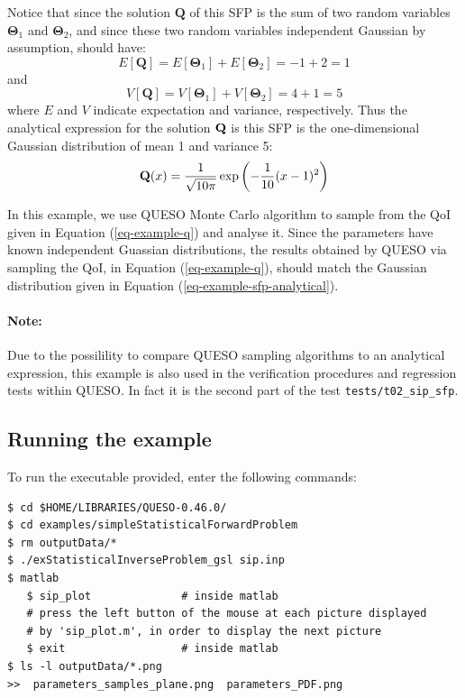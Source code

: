Notice that since the solution $\mathbf{Q}$ of this SFP is the sum of two random variables $\boldsymbol{\Theta}_1$ and $\boldsymbol{\Theta}_2$, and since these two random variables independent Gaussian by assumption, should have:
\begin{equation}\label{eq-example-E}
E[\mathbf{Q}] = E[\boldsymbol{\Theta}_1] + E[\boldsymbol{\Theta}_2] = -1 + 2 = 1
\end{equation}
and
\begin{equation}\label{eq-example-V}
V[\mathbf{Q}] = V[\boldsymbol{\Theta}_1] + V[\boldsymbol{\Theta}_2] = 4 + 1 = 5
\end{equation}
where $E$ and $V$ indicate expectation and variance, respectively. Thus the analytical expression for the solution $\bf{Q}$ is this SFP is the one-dimensional Gaussian distribution of mean 1 and variance 5:
\begin{equation}\label{eq-example-sfp-analytical}
{\bf Q}(x)=   \frac{1}{ \sqrt{10\pi}} \exp\left(-\frac{1}{10}(x-1)^2 \right)
\end{equation}


In this example, we use QUESO Monte Carlo algorithm to sample from the QoI given in Equation (\ref{eq-example-q}) and analyse it. 
Since the parameters have known independent Guassian distributions, the results obtained by QUESO via sampling the QoI, in Equation (\ref{eq-example-q}), should match the Gaussian distribution given in Equation (\ref{eq-example-sfp-analytical}).


\paragraph*{Note:} Due to the possilility to compare QUESO sampling algorithms to an analytical expression, this example is also used in the verification procedures and regression tests within QUESO. In fact it is the second part of the test \verb+tests/t02_sip_sfp+.


\subsection{Running the example}\label{sec:example_sfp}
 

 To run the executable provided, enter the following commands:
\begin{lstlisting}[label={},caption={}]
$ cd $HOME/LIBRARIES/QUESO-0.46.0/
$ cd examples/simpleStatisticalForwardProblem
$ rm outputData/*
$ ./exStatisticalInverseProblem_gsl sip.inp    
$ matlab
   $ sip_plot	           # inside matlab
   # press the left button of the mouse at each picture displayed 
   # by 'sip_plot.m', in order to display the next picture
   $ exit	               # inside matlab
$ ls -l outputData/*.png
>>  parameters_samples_plane.png  parameters_PDF.png
\end{lstlisting}

